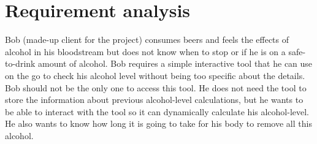 \section{Requirement analysis}
\label{sec:req}

Bob (made-up client for the project) consumes beers and feels the effects of alcohol in his bloodstream but does not know when to stop or if he is on a safe-to-drink amount of alcohol. Bob requires a simple interactive tool that he can use on the go to check his alcohol level without being too specific about the details.\\
  
Bob should not be the only one to access this tool. He does not need the tool to store the information about previous alcohol-level calculations, but he wants to be able to interact with the tool so it can dynamically calculate his alcohol-level. He also wants to know how long it is going to take for his body to remove all this alcohol.